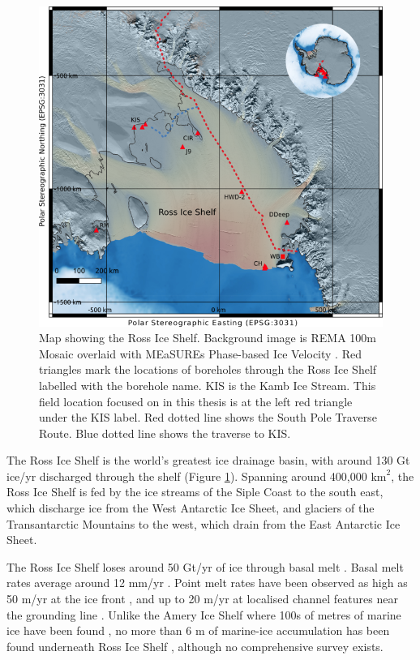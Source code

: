 \begin{figure}[!ht]
\centering
\includegraphics[width=1\textwidth]{chapters/1/ris.png}
\caption[Ross Ice Shelf map]{Map showing the Ross Ice Shelf. Background image is REMA 100m Mosaic \citep{howat2019reference}  overlaid with MEaSUREs Phase-based Ice Velocity \cite{rignot2011ice}. Red triangles mark the locations of boreholes through the Ross Ice Shelf labelled with the borehole name. KIS is the Kamb Ice Stream. This field location focused on in this thesis is at the left red triangle under the KIS label. Red dotted line shows the South Pole Traverse Route. Blue dotted line shows the traverse to KIS.}
\label{fig:ris}
\end{figure}  

The Ross Ice Shelf is the world's greatest ice drainage basin, with around 130 Gt ice/yr discharged through the shelf \citep{rignot2008recent} (Figure \ref{fig:ris}). Spanning around 400,000 $\mathrm{km}^2$, the Ross Ice Shelf is fed by the ice streams of the Siple Coast to the south east, which discharge ice from the West Antarctic Ice Sheet, and glaciers of the Transantarctic Mountains to the west, which drain from the East Antarctic Ice Sheet. 

The Ross Ice Shelf loses around 50 Gt/yr of ice through basal melt \citep{rignot2013ice,moholdt2014basal,das2020multidecadal}.  Basal melt rates  average around 12 mm/yr \citep{moholdt2014basal}. Point melt rates have been observed as high as 50 m/yr at the ice front \citep{stewart2019basal}, and up to 20 m/yr at localised channel features near the grounding line \citep{marsh2016high}. Unlike the Amery Ice Shelf where 100s of metres of marine ice have been found \citep{craven2009properties}, no more than 6 m of marine-ice accumulation has been found underneath Ross Ice Shelf \citep{zotikov1980core}, although no comprehensive survey exists.

